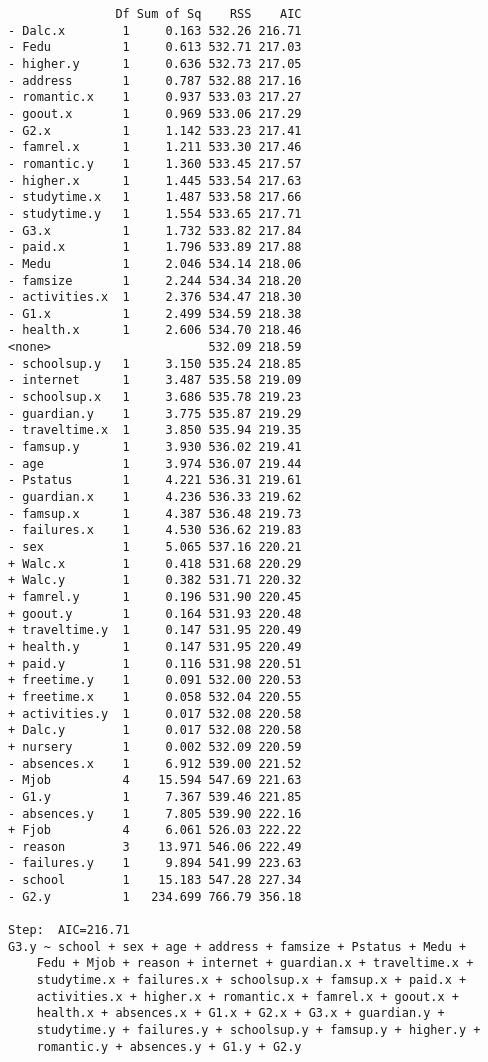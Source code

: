\documentclass[11pt]{article}
\begin{document}
\begin{enumerate}
\begin{verbatim}
               Df Sum of Sq    RSS    AIC
- Dalc.x        1     0.163 532.26 216.71
- Fedu          1     0.613 532.71 217.03
- higher.y      1     0.636 532.73 217.05
- address       1     0.787 532.88 217.16
- romantic.x    1     0.937 533.03 217.27
- goout.x       1     0.969 533.06 217.29
- G2.x          1     1.142 533.23 217.41
- famrel.x      1     1.211 533.30 217.46
- romantic.y    1     1.360 533.45 217.57
- higher.x      1     1.445 533.54 217.63
- studytime.x   1     1.487 533.58 217.66
- studytime.y   1     1.554 533.65 217.71
- G3.x          1     1.732 533.82 217.84
- paid.x        1     1.796 533.89 217.88
- Medu          1     2.046 534.14 218.06
- famsize       1     2.244 534.34 218.20
- activities.x  1     2.376 534.47 218.30
- G1.x          1     2.499 534.59 218.38
- health.x      1     2.606 534.70 218.46
<none>                      532.09 218.59
- schoolsup.y   1     3.150 535.24 218.85
- internet      1     3.487 535.58 219.09
- schoolsup.x   1     3.686 535.78 219.23
- guardian.y    1     3.775 535.87 219.29
- traveltime.x  1     3.850 535.94 219.35
- famsup.y      1     3.930 536.02 219.41
- age           1     3.974 536.07 219.44
- Pstatus       1     4.221 536.31 219.61
- guardian.x    1     4.236 536.33 219.62
- famsup.x      1     4.387 536.48 219.73
- failures.x    1     4.530 536.62 219.83
- sex           1     5.065 537.16 220.21
+ Walc.x        1     0.418 531.68 220.29
+ Walc.y        1     0.382 531.71 220.32
+ famrel.y      1     0.196 531.90 220.45
+ goout.y       1     0.164 531.93 220.48
+ traveltime.y  1     0.147 531.95 220.49
+ health.y      1     0.147 531.95 220.49
+ paid.y        1     0.116 531.98 220.51
+ freetime.y    1     0.091 532.00 220.53
+ freetime.x    1     0.058 532.04 220.55
+ activities.y  1     0.017 532.08 220.58
+ Dalc.y        1     0.017 532.08 220.58
+ nursery       1     0.002 532.09 220.59
- absences.x    1     6.912 539.00 221.52
- Mjob          4    15.594 547.69 221.63
- G1.y          1     7.367 539.46 221.85
- absences.y    1     7.805 539.90 222.16
+ Fjob          4     6.061 526.03 222.22
- reason        3    13.971 546.06 222.49
- failures.y    1     9.894 541.99 223.63
- school        1    15.183 547.28 227.34
- G2.y          1   234.699 766.79 356.18

Step:  AIC=216.71
G3.y ~ school + sex + age + address + famsize + Pstatus + Medu + 
    Fedu + Mjob + reason + internet + guardian.x + traveltime.x + 
    studytime.x + failures.x + schoolsup.x + famsup.x + paid.x + 
    activities.x + higher.x + romantic.x + famrel.x + goout.x + 
    health.x + absences.x + G1.x + G2.x + G3.x + guardian.y + 
    studytime.y + failures.y + schoolsup.y + famsup.y + higher.y + 
    romantic.y + absences.y + G1.y + G2.y


\end{verbatim}
\end{enumerate}
\end{document}
